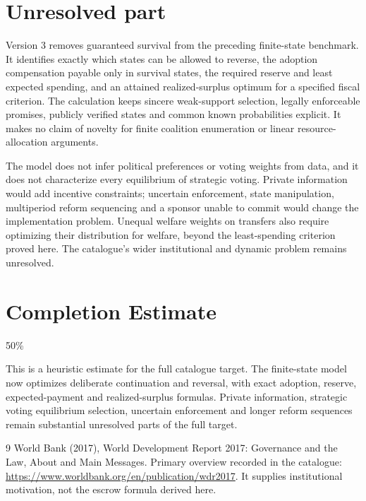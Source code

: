 \documentclass[11pt]{article}
\theoremstyle{definition}
\begin{document}
\section*{Unresolved part}
Version 3 removes guaranteed survival from the preceding finite-state
benchmark. It identifies exactly which states can be allowed to reverse,
the adoption compensation payable only in survival states, the required
reserve and least expected spending, and an attained realized-surplus
optimum for a specified fiscal criterion. The calculation keeps sincere
weak-support selection, legally enforceable promises, publicly verified
states and common known probabilities explicit. It makes no claim of
novelty for finite coalition enumeration or linear resource-allocation
arguments.

The model does not infer political preferences or voting weights from
data, and it does not characterize every equilibrium of strategic
voting. Private information would add incentive constraints; uncertain
enforcement, state manipulation, multiperiod reform sequencing and a
sponsor unable to commit would change the implementation problem.
Unequal welfare weights on transfers also require optimizing their
distribution for welfare, beyond the least-spending criterion proved
here. The catalogue's wider institutional and dynamic problem remains
unresolved.

\section{Completion Estimate}
50\%

This is a heuristic estimate for the full catalogue target.
The finite-state model now optimizes deliberate continuation and reversal,
with exact adoption, reserve, expected-payment and realized-surplus
formulas. Private information, strategic voting equilibrium selection,
uncertain enforcement and longer reform sequences remain substantial
unresolved parts of the full target.

\begin{thebibliography}{9}
 World Bank (2017), World Development Report 2017: Governance and the Law, About and Main Messages. Primary overview recorded in the catalogue: \url{https://www.worldbank.org/en/publication/wdr2017}. It supplies institutional motivation, not the escrow formula derived here.
\end{thebibliography}
\end{document}
